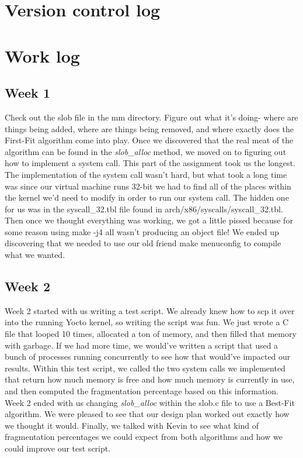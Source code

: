 \documentclass[letterpaper,10pt,titlepage]{article}
\begin{document}
\section{Version control log}
\begin{versionhistory}
\end{versionhistory}

\section{Work log}
\subsection{Week 1}
Check out the slob file in the mm directory. Figure out what it's doing- where are things being added, where are things being removed, and where exactly does the First-Fit algorithm come into play. Once we discovered that the real meat of the algorithm can be found in the \emph{slob\_alloc} method, we moved on to figuring out how to implement a system call. This part of the assignment took us the longest. The implementation of the system call wasn't hard, but what took a long time was since our virtual machine runs 32-bit we had to find all of the places within the kernel we'd need to modify in order to run our system call. The hidden one for us was in the syscall\_32.tbl file found in arch/x86/syscalls/syscall\_32.tbl. Then once we thought everything was working, we got a little pissed because for some reason using make -j4 all wasn't producing an object file! We ended up discovering that we needed to use our old friend make menuconfig to compile what we wanted. 
\subsection{Week 2}
Week 2 started with us writing a test script. We already knew how to scp it over into the running Yocto kernel, so writing the script was fun. We just wrote a C file that looped 10 times, allocated a ton of memory, and then filled that memory with garbage. If we had more time, we would've written a script that used a bunch of processes running concurrently to see how that would've impacted our results. Within this test script, we called the two system calls we implemented that return how much memory is free and how much memory is currently in use, and then computed the fragmentation percentage based on this information. Week 2 ended with us changing \emph{slob\_alloc} within the slob.c file to use a Best-Fit algorithm. We were pleased to see that our design plan worked out exactly how we thought it would. Finally, we talked with Kevin to see what kind of fragmentation percentages we could expect from both algorithms and how we could improve our test script.
\end{document}
